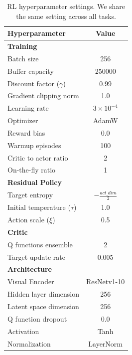\begin{table}[h]
\caption{RL hyperparameter settings. We share the same setting across all tasks.}
\label{tab: hyperparams}
\vskip 0.15in
\begin{center}
\begin{small}
\begin{tabular}{l|c}
\toprule
\textbf{Hyperparameter}       & \textbf{Value}   \\ 
\midrule
\multicolumn{2}{l}{\textbf{Training}} \\ \midrule
Batch size                    & 256 \\
Buffer capacity               & 250000  \\
Discount factor ($\gamma$)    & 0.99    \\
Gradient clipping norm        & 1.0     \\
Learning rate                 & $3 \times 10^{-4}$  \\
Optimizer                     & AdamW  \\
Reward bias                   & 0.0  \\
Warmup episodes               & 100  \\
Critic to actor ratio         & 2  \\
On-the-fly ratio              & 1  \\

\midrule
\multicolumn{2}{l}{\textbf{Residual Policy}} \\ \midrule
Target entropy                & \(-\frac{act\_dim}{2}\)  \\
Initial temperature ($\tau$)  & 1.0 \\    
Action scale ($\xi$)          & 0.5 \\


\midrule
\multicolumn{2}{l}{\textbf{Critic}} \\ \midrule
Q functions ensemble           & 2   \\
Target update rate            & 0.005   \\


\midrule
\multicolumn{2}{l}{\textbf{Architecture}} \\ \midrule
Visual Encoder                & ResNetv1-10 \\
Hidden layer dimension        & 256 \\
Latent space dimension        & 256 \\
Q function dropout           & 0.0 \\
Activation                    & Tanh \\
Normalization                 & LayerNorm \\
\bottomrule
\end{tabular}
\end{small}
\end{center}
\vskip -0.1in
\end{table}

